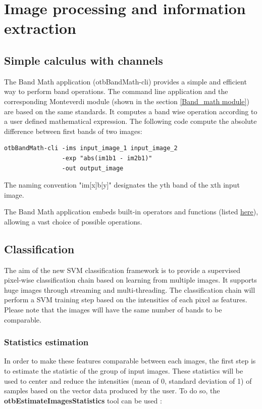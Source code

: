 \section{Image processing and information extraction}\label{sec:improc}

\subsection{Simple calculus with channels}\label{ssec:calculus}

The Band Math application (otbBandMath-cli) provides a simple and efficient way to perform band operations. The command line application and the corresponding Monteverdi module (shown in the section \ref{Band_math module}) are based on the same standards. It computes a band wise operation according to a user defined mathematical expression. The following code compute the absolute difference between first bands of two images:

\begin{verbatim}
otbBandMath-cli -ims input_image_1 input_image_2 
                -exp "abs(im1b1 - im2b1)"
                -out output_image
\end{verbatim}

The naming convention "im[x]b[y]" designates the yth band of the xth input image.

The Band Math application embeds built-in operators and functions (listed \href{http://muparser.sourceforge.net/mup_features.html#idDef2}{here}), allowing a vast choice of possible operations. 

\subsection{Classification}\label{ssec:classification}

The aim of the new SVM classification framework is to provide a supervised pixel-wise classification chain based on learning from multiple images. It supports huge images through streaming and multi-threading.
The classification chain will perform a SVM training step based on the intensities of each pixel as features. Please note that the images will have the same number of bands to be comparable.

\subsubsection{Statistics estimation}
In order to make these features comparable between each images, the first step is to estimate the statistic of the group of input images. These statistics will be used to center and reduce the intensities (mean of 0, standard deviation of 1) of samples based on the vector data produced by the user. To do so, the \textbf{otbEstimateImagesStatistics} tool can be used :

